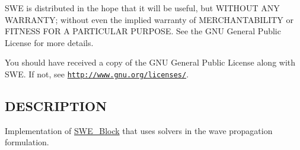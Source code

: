 S\-W\-E is distributed in the hope that it will be useful, but W\-I\-T\-H\-O\-U\-T A\-N\-Y W\-A\-R\-R\-A\-N\-T\-Y; without even the implied warranty of M\-E\-R\-C\-H\-A\-N\-T\-A\-B\-I\-L\-I\-T\-Y or F\-I\-T\-N\-E\-S\-S F\-O\-R A P\-A\-R\-T\-I\-C\-U\-L\-A\-R P\-U\-R\-P\-O\-S\-E. See the G\-N\-U General Public License for more details.

You should have received a copy of the G\-N\-U General Public License along with S\-W\-E. If not, see \href{http://www.gnu.org/licenses/}{\tt http\-://www.\-gnu.\-org/licenses/}.\hypertarget{NetCdfWriter_8hh_DESCRIPTION}{}\subsection{D\-E\-S\-C\-R\-I\-P\-T\-I\-O\-N}\label{NetCdfWriter_8hh_DESCRIPTION}
Implementation of \hyperlink{classSWE__Block}{S\-W\-E\-\_\-\-Block} that uses solvers in the wave propagation formulation. 
